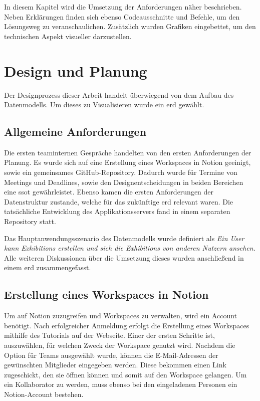 In diesem Kapitel wird die Umsetzung der Anforderungen näher beschrieben. 
Neben Erklärungen finden sich ebenso Codeausschnitte und Befehle, um den Lösungsweg zu veranschaulichen.
Zusätzlich wurden Grafiken eingebettet, um den technischen Aspekt visueller darzustellen.

\section{Design und Planung}

Der Designprozess dieser Arbeit handelt überwiegend von dem Aufbau des Datenmodells. 
Um dieses zu Visualisieren wurde ein \gls{erd} gewählt.

\subsection{Allgemeine Anforderungen}
Die ersten teaminternen Gespräche handelten von den ersten Anforderungen der Planung. 
Es wurde sich auf eine Erstellung eines Workspaces in Notion geeinigt, sowie ein gemeinsames GitHub-Repository. 
Dadurch wurde für Termine von Meetings und Deadlines, sowie den Designentscheidungen in beiden Bereichen eine \gls{ssot} gewährleistet.
Ebenso kamen die ersten Anforderungen der Datenstruktur zustande, welche für das zukünftige \gls{erd} relevant waren.
Die tatsächliche Entwicklung des Applikationsservers fand in einem separaten Repository statt. 

Das Hauptanwendungsszenario des Datenmodells wurde definiert als \emph{Ein User kann Exhibitions erstellen und sich die Exhibitions von anderen Nutzern ansehen.} 
Alle weiteren Diskussionen über die Umsetzung dieses wurden anschließend in einem \gls{erd} zusammengefasst.

\subsection{Erstellung eines Workspaces in Notion}

Um auf Notion zuzugreifen und Workspaces zu verwalten, wird ein Account benötigt. 
Nach erfolgreicher Anmeldung erfolgt die Erstellung eines Workspaces mithilfe des Tutorials auf der Webseite. 
Einer der ersten Schritte ist, auszuwählen, für welchen Zweck der Workspace genutzt wird. 
Nachdem die Option für Teams ausgewählt wurde, können die E-Mail-Adressen der gewünschten Mitglieder eingegeben werden. 
Diese bekommen einen Link zugeschickt, den sie öffnen können und somit auf den Workspace gelangen. 
Um ein Kollaborator zu werden, muss ebenso bei den eingeladenen Personen ein Notion-Account bestehen.

